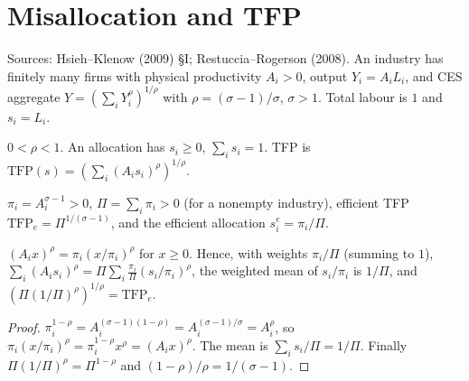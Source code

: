 \chapter{Misallocation and TFP}
\label{chap:misallocation}

Sources: Hsieh--Klenow (2009) \S I; Restuccia--Rogerson (2008). An industry has finitely many firms with physical
productivity $A_i > 0$, output $Y_i = A_i L_i$, and CES aggregate $Y = (\sum_i Y_i^\rho)^{1/\rho}$ with
$\rho = (\sigma - 1)/\sigma$, $\sigma > 1$. Total labour is $1$ and $s_i = L_i$.

\begin{definition}
\label{def:industry}
\leanok
$0 < \rho < 1$. An allocation has $s_i \ge 0$, $\sum_i s_i = 1$. TFP is $\mathrm{TFP}(s) = (\sum_i (A_i s_i)^\rho)^{1/\rho}$.
\end{definition}

\begin{definition}
\label{def:effAlloc}
\leanok
{}
$\pi_i = A_i^{\sigma - 1} > 0$, $\Pi = \sum_i \pi_i > 0$ (for a nonempty industry), efficient TFP
$\mathrm{TFP}_e = \Pi^{1/(\sigma-1)}$, and the efficient allocation $s^e_i = \pi_i/\Pi$.
\end{definition}

\begin{lemma}
\label{lem:tfp_jensen_form}
\leanok
{}
$(A_i x)^\rho = \pi_i (x/\pi_i)^\rho$ for $x \ge 0$. Hence, with weights $\pi_i/\Pi$ (summing to $1$),
$\sum_i (A_i s_i)^\rho = \Pi \sum_i \frac{\pi_i}{\Pi}(s_i/\pi_i)^\rho$, the weighted mean of $s_i/\pi_i$ is $1/\Pi$,
and $(\Pi (1/\Pi)^\rho)^{1/\rho} = \mathrm{TFP}_e$.
\end{lemma}
\begin{proof}
\leanok
$\pi_i^{1 - \rho} = A_i^{(\sigma-1)(1 - \rho)} = A_i^{(\sigma-1)/\sigma} = A_i^\rho$, so
$\pi_i (x/\pi_i)^\rho = \pi_i^{1-\rho} x^\rho = (A_i x)^\rho$. The mean is $\sum_i s_i/\Pi = 1/\Pi$. Finally
$\Pi(1/\Pi)^\rho = \Pi^{1-\rho}$ and $(1 - \rho)/\rho = 1/(\sigma - 1)$.
\end{proof}

